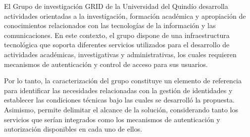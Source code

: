 \label{cap:caracterizacion-grid}
\vspace*{0.7cm}

El Grupo de investigación \ac{GRID} de la Universidad del Quindío desarrolla actividades orientadas a la investigación, formación académica y apropiación de conocimientos relacionados con las tecnologías de la información y las comunicaciones. En este contexto, el grupo dispone de una infraestructura tecnológica que soporta diferentes servicios utilizados para el desarrollo de actividades académicas, investigativas y administrativas, los cuales requieren mecanismos de autenticación y control de acceso para sus usuarios.

Por lo tanto, la caracterización del grupo constituye un elemento de referencia para identificar las necesidades relacionadas con la gestión de identidades y establecer las condiciones técnicas bajo las cuales se desarrolló la propuesta. Asimismo, permite delimitar el alcance de la solución, considerando tanto los servicios que serían integrados como los mecanismos de autenticación y autorización disponibles en cada uno de ellos.








